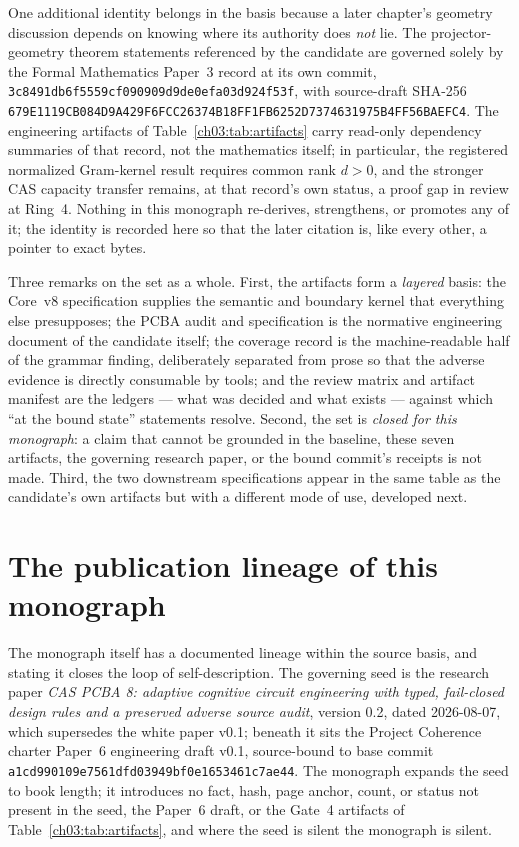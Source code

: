One additional identity belongs in the basis because a later chapter's
geometry discussion depends on knowing where its authority does
\emph{not} lie. The projector-geometry theorem statements referenced by
the candidate are governed solely by the Formal Mathematics Paper~3
record at its own commit,
\texttt{3c8491db6f5559cf090909d9de0efa03d924f53f}, with source-draft
SHA-256
\texttt{679E1119CB084D9A429F6FCC26374B18FF1FB6252D7374631975B4FF56BAEFC4}.
The engineering artifacts of Table~\ref{ch03:tab:artifacts} carry
read-only dependency summaries of that record, not the mathematics
itself; in particular, the registered normalized Gram-kernel result
requires common rank $d>0$, and the stronger CAS capacity transfer
remains, at that record's own status, a proof gap in review at Ring~4.
Nothing in this monograph re-derives, strengthens, or promotes any of
it; the identity is recorded here so that the later citation is, like
every other, a pointer to exact bytes.

Three remarks on the set as a whole. First, the artifacts form a
\emph{layered} basis: the Core~v8 specification supplies the semantic
and boundary kernel that everything else presupposes; the PCBA audit and
specification is the normative engineering document of the candidate
itself; the coverage record is the machine-readable half of the
grammar finding, deliberately separated from prose so that the adverse
evidence is directly consumable by tools; and the review matrix and
artifact manifest are the ledgers --- what was decided and what exists
--- against which ``at the bound state'' statements resolve. Second,
the set is \emph{closed for this monograph}: a claim that cannot be
grounded in the baseline, these seven artifacts, the governing research
paper, or the bound commit's receipts is not made. Third, the two
downstream specifications appear in the same table as the candidate's
own artifacts but with a different mode of use, developed next.

\section{The publication lineage of this monograph}\label{ch03:lineage}

The monograph itself has a documented lineage within the source basis,
and stating it closes the loop of self-description. The governing seed is
the research paper \emph{CAS PCBA 8: adaptive cognitive circuit
engineering with typed, fail-closed design rules and a preserved adverse
source audit}, version 0.2, dated 2026-08-07, which supersedes the white
paper v0.1; beneath it sits the Project Coherence charter Paper~6
engineering draft v0.1, source-bound to base commit
\texttt{a1cd990109e7561dfd03949bf0e1653461c7ae44}. The monograph expands
the seed to book length; it introduces no fact, hash, page anchor,
count, or status not present in the seed, the Paper~6 draft, or the
Gate~4 artifacts of Table~\ref{ch03:tab:artifacts}, and where the seed
is silent the monograph is silent.

